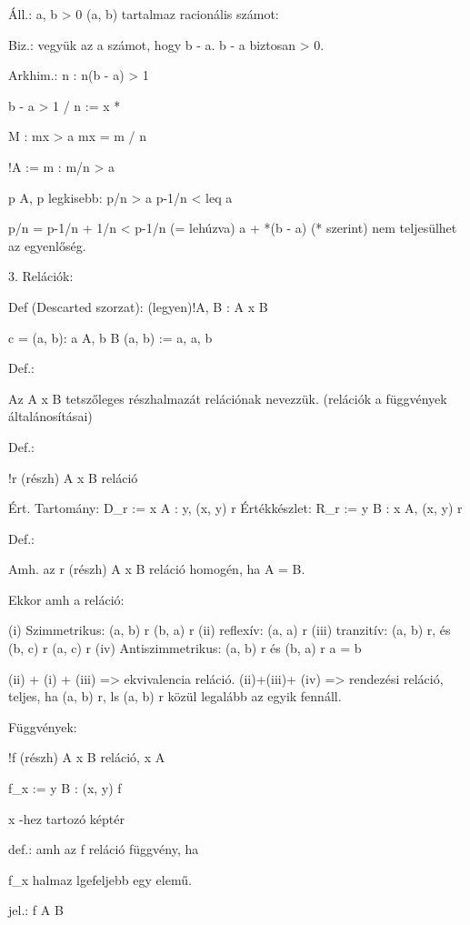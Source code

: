 Áll.:
\forall a, b > 0 (a, b) tartalmaz racionális számot:

Biz.:
vegyük az a számot, hogy b - a.
b - a biztosan > 0.

Arkhim.:
\exists n \in {}: n(b - a) > 1

b - a > 1 / n := x   *


\exists M \in {}: mx > a
mx = m / n

!A := { m \in {}: m/n > a }


\exists p \in A, p legkisebb: p/n > a
p-1/n < leq a

p/n = p-1/n + 1/n < p-1/n \leq (= lehúzva) a + *(b - a)
(* szerint)
nem teljesülhet az egyenlőség.


3. Relációk:

Def (Descarted szorzat):
(legyen)!A, B \neq \emptyset : A x B

c = { (a, b): a \in A, b \in B }
(a, b) := { {a}, {a, b}}

Def.:

Az A x B tetszőleges részhalmazát relációnak nevezzük.
(relációk a függvények általánosításai)

Def.:

!r (részh) A x B reláció

Ért. Tartomány: D_r := {x \in A : \exists y, (x, y) \in r }
Értékkészlet: R_r := {y \in B : \exists x \in A, (x, y) \in r}

Def.:

Amh. az r (részh) A x B reláció homogén, ha A = B.

Ekkor amh a reláció:

(i) Szimmetrikus: (a, b) \in r \rightarrow (b, a) \in r
(ii) reflexív: (a, a) \in r
(iii) tranzitív: (a, b) \in r, és (b, c) \in r \Rightarrow (a, c) \in r
(iv) Antiszimmetrikus: (a, b) \in r és (b, a) \in r \Rightarrow a = b

(ii) + (i) + (iii) => ekvivalencia reláció.
(ii)+(iii)+ (iv) => rendezési reláció, teljes, ha (a, b) \in r, ls (a, b) \in r közül legalább az egyik fennáll.

Függvények:

!f (részh) A x B reláció, x \in A

f_x := {y \in B : (x, y) \in f}

x -hez tartozó képtér

def.:
amh az f reláció függvény, ha

f_x halmaz lgefeljebb egy elemű.

jel.: f \in A \rightarrow B

